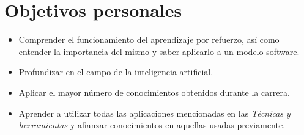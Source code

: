 \section{Objetivos personales}

\begin{itemize}
    \item Comprender el funcionamiento del aprendizaje por refuerzo, así como entender la importancia del mismo y saber aplicarlo a un modelo software.
    \item Profundizar en el campo de la inteligencia artificial.
    \item Aplicar el mayor número de conocimientos obtenidos durante la carrera.
    \item Aprender a utilizar todas las aplicaciones mencionadas en las \textit{Técnicas y herramientas} y afianzar conocimientos en aquellas usadas previamente.
\end{itemize}